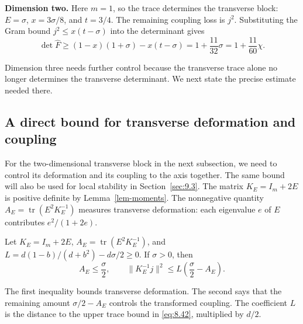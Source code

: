 \textbf{Dimension two.} Here $m=1$, so the trace determines the transverse block:
$E=\sigma$, $x=3\sigma/8$, and $t=3/4$.
The remaining coupling loss is $j^2$. Substituting the Gram bound
$j^2\le x(t-\sigma)$ into the determinant gives
\begin{equation}\label{eq:8.48}
\det\widehat F\ge(1-x)(1+\sigma)-x(t-\sigma)
=1+\frac{11}{32}\sigma=1+\frac{11}{60}\chi.
\end{equation}

Dimension three needs further control because the transverse trace alone no
longer determines the transverse determinant. We next state the precise
estimate needed there.

\subsection{A direct bound for transverse deformation and coupling}\label{sec:8.4}

For the two-dimensional transverse block in the next subsection, we need to
control its deformation and its coupling to the axis together. The same
bound will also be used for local stability in Section~\ref{sec:9.3}.
The matrix $K_E=I_m+2E$ is positive definite by Lemma~\ref{lem-moments}.
The nonnegative quantity $A_E=\operatorname{tr}(E^2K_E^{-1})$ measures
transverse deformation: each eigenvalue $e$ of $E$ contributes $e^2/(1+2e)$.

\begin{lemma}\label{lem-variational}
Let
$K_E=I_m+2E$, $A_E=\operatorname{tr}(E^2K_E^{-1})$, and
$L=d(1-b)/(d+b^2)-d\sigma/2\ge0$.
If $\sigma>0$, then
\begin{equation}\label{eq:8.49}
A_E\le\frac\sigma2,\qquad
\|K_E^{-1}j\|^2\le L\left(\frac\sigma2-A_E\right).
\end{equation}

\end{lemma}

The first inequality bounds transverse deformation. The second says that
the remaining amount $\sigma/2-A_E$ controls the transformed coupling.
The coefficient $L$ is the distance to the upper trace bound in
\eqref{eq:8.42}, multiplied by $d/2$.

